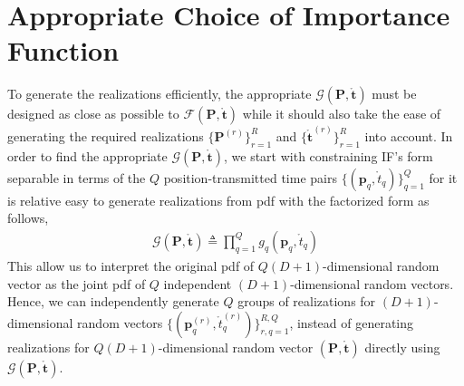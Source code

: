 \documentclass[review]{elsarticle}
\begin{document}
\section{Appropriate Choice of Importance Function}
To generate the realizations efficiently, the appropriate $\mathcal{G}(\boldsymbol{P},\mathring{\boldsymbol{t}})$ must be designed as close as possible to $\mathcal{F}(\boldsymbol{P},\mathring{\boldsymbol{t}})$ while it should also take the ease of generating the required realizations $\lbrace \boldsymbol{P}^{(r)}\rbrace_{r=1}^R$ and $\lbrace \mathring{\boldsymbol{t}}^{(r)}\rbrace_{r=1}^R$ into account. 
In order to find the appropriate $\mathcal{G}(\boldsymbol{P},\mathring{\boldsymbol{t}})$, we start with constraining IF's form separable in terms of the $Q$ position-transmitted time pairs $\lbrace(\boldsymbol{p}_q,\mathring{t}_q)\rbrace_{q=1}^Q$ for it is relative easy to generate realizations from pdf with the factorized form as follows,
\begin{align}\label{SForm}
    \mathcal{G}(\boldsymbol{P},\mathring{\boldsymbol{t}})\triangleq \prod_{q=1}^Q g_q(\boldsymbol{p}_q,\mathring{t}_q)
\end{align}
This allow us to interpret the original pdf of $Q(D+1)$-dimensional random vector as the joint pdf of $Q$ independent $(D+1)$-dimensional random vectors. Hence, we can independently generate $Q$ groups of realizations for $(D+1)$-dimensional random vectors $\lbrace(\boldsymbol{p}_q^{(r)},\mathring{t}_q^{(r)})\rbrace_{r,q=1}^{R,Q}$, instead of generating realizations for $Q(D+1)$-dimensional random vector $(\boldsymbol{P},\mathring{\boldsymbol{t}})$ directly using $\mathcal{G}(\boldsymbol{P},\mathring{\boldsymbol{t}})$. 
\end{document}
